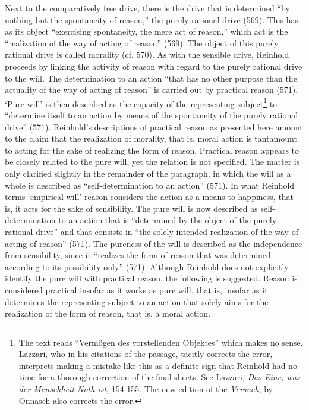  Next to the comparatively free drive, there is the drive that is determined ``by nothing but the spontaneity of reason,'' the purely rational drive (569). This has as its object ``exercising spontaneity, the mere act of reason,'' which act is the ``realization of the way of acting of reason'' (569). The object of this purely rational drive is called morality (cf. 570). As with the sensible drive, Reinhold proceeds by linking the activity of reason with regard to the purely rational drive to the will. The determination to an action ``that has no other purpose than the actuality of the way of acting of reason'' is carried out by practical reason (571). `Pure will' is then described as the capacity of the representing subject\footnote{ The text reads ``Verm\"{o}gen des vorstellenden Objektes'' which makes no sense. Lazzari, who in his citations of the passage, tacitly corrects the error, interprets making a mistake like this as a definite sign that Reinhold had no time for a thorough correction of the final sheets. See Lazzari, \textit{Das Eine, was der Menschheit Noth ist}, 154{-}155. The new edition of the \textit{Versuch}, by Onnasch also corrects the error. } to ``determine itself to an action by means of the spontaneity of the purely rational drive'' (571). Reinhold's descriptions of practical reason as presented here amount to the claim that the realization of morality, that is, moral action is tantamount to acting for the sake of realizing the form of reason. Practical reason appears to be closely related to the pure will, yet the relation is not specified. The matter is only clarified slightly in the remainder of the paragraph, in which the will as a whole is described as ``self{-}determination to an action'' (571). In what Reinhold terms `empirical will' reason considers the action as a means to happiness, that is, it acts for the sake of sensibility. The pure will is now described as self{-}determination to an action that is ``determined by the object of the purely rational drive'' and that consists in ``the solely intended realization of the way of acting of reason'' (571). The pureness of the will is described as the independence from sensibility, since it ``realizes the form of reason that was determined according to its possibility only'' (571). Although Reinhold does not explicitly identify the pure will with practical reason, the following is suggested. Reason is considered practical insofar as it works as pure will, that is, insofar as it determines the representing subject to an action that solely aims for the realization of the form of reason, that is, a moral action. 

